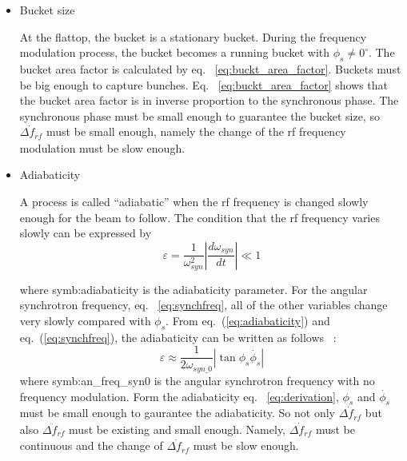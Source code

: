 \begin{itemize}
\item Bucket size

At the flattop, the bucket is a stationary bucket. During the frequency modulation process, the bucket becomes a running bucket with $\phi_{s}\neq 0^\circ$. The bucket area factor is calculated by eq. ~\ref{eq:buckt_area_factor}. Buckets must be big enough to capture bunches. Eq. ~\ref{eq:buckt_area_factor} shows that the bucket area factor is in inverse proportion to the synchronous phase. The synchronous phase must be small enough to guarantee the bucket size, so $\dot{\Delta f_{\mathit{rf}}}$ must be small enough, namely the change of the rf frequency modulation must be slow enough.

\item Adiabaticity 


A process is called “adiabatic” when the rf frequency is changed slowly enough for the beam to follow. The condition that the rf frequency varies slowly can be expressed by 
\begin{equation}
\varepsilon=\frac{1}{\omega_\mathit{syn}^2}|\frac{d\omega_\mathit{syn}}{dt}| \ll 1
\label{eq:adiabaticity}
\end{equation} 

where \gls{symb:adiabaticity} is the adiabaticity parameter. For the angular synchrotron frequency, eq. ~\ref{eq:synchfreq}, all of the other variables change very slowly compared with $\phi_s$. From eq.~(\ref{eq:adiabaticity}) and eq.~(\ref{eq:synchfreq}), the adiabaticity can be written as follows ~\cite{ezura_beam-dynamics_2008}:
\begin{equation}
\varepsilon \approx \frac{1}{2\omega_{\mathit{syn\_0}}}|\tan \phi_s\dot{\phi_{s}}|
\label{eq:derivation}
\end{equation} 
where \gls{symb:an_freq_syn0} is the angular synchrotron frequency with no frequency modulation. Form the adiabaticity eq. ~\ref{eq:derivation}, $\phi_{s}$ and $\dot{\phi_{s}}$ must be small enough to gaurantee the adiabaticity. So not only $\dot{\Delta f_{\mathit{rf}}}$ but also $\ddot{\Delta f_{\mathit{rf}}}$ must be existing and small enough. Namely, $\dot{\Delta f_{\mathit{rf}}}$ must be continuous and the change of $\dot{\Delta f_{\mathit{rf}}}$ must be slow enough. 


\end{itemize}
